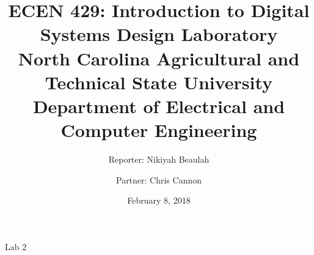 \documentclass[11pt]{article}
\title {ECEN 429: Introduction to Digital Systems Design Laboratory \\ North Carolina Agricultural and Technical State University \\ Department of Electrical and Computer Engineering} %
\author{Reporter: Nikiyah Beaulah\\ \and Partner: Chris Cannon} %
\date{February 8, 2018}
\begin{document}
\maketitle %

\begin{center}
Lab	2
\end{center}

\pagebreak
\end{document}
